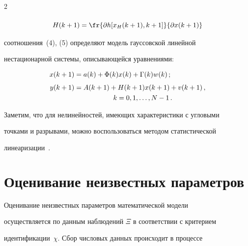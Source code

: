 \begin{multicols}{2}
\begin{multline}
\end{multline}





\vspace*{-8pt}





\noindent


\begin{equation}


H(k+1)=\fr{\partial h[x_H(k+1),k+1]}{\partial x(k+1)}


\label{e9-c}


\end{equation}


соотношения~(4), (5) определяют модель гауссовской линейной


нестационарной системы, описывающейся уравнениями:


\begin{align}


x(k+1) &= a(k)+\Phi(k)x(k)+\Gamma(k) w(k)\,;\label{e10-c}\\[4pt]


y(k+1) &=A(k+1) +H(k+1) x(k+1)+v(k+1)\,,\notag\\


&\hspace*{20mm} k=0, 1, \ldots , N-1\,.\label{e11-c}


\end{align}





  Заметим, что для нелинейностей, имеющих характеристики с угловыми


точками и разрывами, можно воспользоваться методом статистической


линеаризации~\cite{12-c, 13-c}.





\section{Оценивание неизвестных параметров}





  Оценивание неизвестных параметров математической модели


осуществляется по данным наблюдений $\Xi$ в соответствии с критерием


идентификации~$\chi$. Сбор числовых данных происходит в процессе



\end{multicols}
